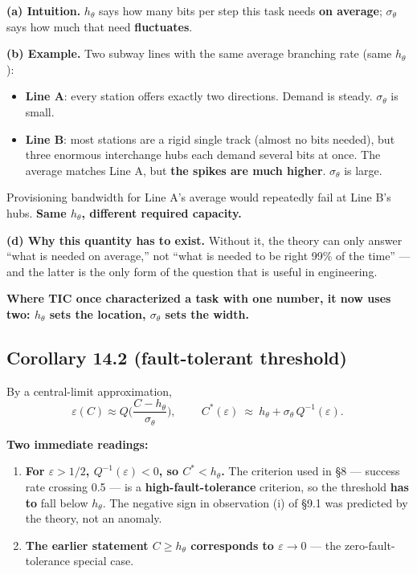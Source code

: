 \documentclass[11pt]{article}
\providecommand{\tightlist}{%
  \setlength{\itemsep}{0pt}\setlength{\parskip}{0pt}}
\renewenvironment{quote}
  {\def\FrameCommand{{\color{gray!60}\vrule width 2pt}\hspace{8pt}}%
   \MakeFramed{\advance\hsize-\width \FrameRestore}\begin{itshape}}
  {\end{itshape}\endMakeFramed}
\begin{document}
\textbf{(a) Intuition.} \(h_\theta\) says how many bits per step this task needs \textbf{on average}; \(\sigma_\theta\) says how much that need \textbf{fluctuates}.

\textbf{(b) Example.} Two subway lines with the same average branching rate (same \(h_\theta\)):

\begin{itemize}
\tightlist
\item
  \textbf{Line A}: every station offers exactly two directions. Demand is steady. \(\sigma_\theta\) is small.
\item
  \textbf{Line B}: most stations are a rigid single track (almost no bits needed), but three enormous interchange hubs each demand several bits at once. The average matches Line A, but \textbf{the spikes are much higher}. \(\sigma_\theta\) is large.
\end{itemize}

Provisioning bandwidth for Line A's average would repeatedly fail at Line B's hubs. \textbf{Same \(h_\theta\), different required capacity.}

\textbf{(d) Why this quantity has to exist.} Without it, the theory can only answer ``what is needed on average,'' not ``what is needed to be right 99\% of the time'' --- and the latter is the only form of the question that is useful in engineering.

\begin{quote}
\textbf{Where TIC once characterized a task with one number, it now uses two: \(h_\theta\) sets the location, \(\sigma_\theta\) sets the width.}
\end{quote}

\hypertarget{corollary-14.2-fault-tolerant-threshold}{%
\subsection{Corollary 14.2 (fault-tolerant threshold)}\label{corollary-14.2-fault-tolerant-threshold}}

By a central-limit approximation,
\[\varepsilon(C)\approx Q\!\Big(\frac{C-h_\theta}{\sigma_\theta}\Big),\qquad
\boxed{\ C^*(\varepsilon)\ \approx\ h_\theta+\sigma_\theta\,Q^{-1}(\varepsilon).\ }\]

\textbf{Two immediate readings:}

\begin{enumerate}
\def\labelenumi{\arabic{enumi}.}
\tightlist
\item
  \textbf{For \(\varepsilon>1/2\), \(Q^{-1}(\varepsilon)<0\), so \(C^*<h_\theta\).} The criterion used in \S{}8 --- success rate crossing 0.5 --- is a \textbf{high-fault-tolerance} criterion, so the threshold \textbf{has to} fall below \(h_\theta\). The negative sign in observation (i) of \S{}9.1 was predicted by the theory, not an anomaly.
\item
  \textbf{The earlier statement \(C\ge h_\theta\) corresponds to \(\varepsilon\to0\)} --- the zero-fault-tolerance special case.
\end{enumerate}
\end{document}
